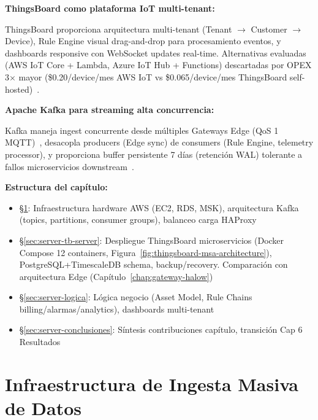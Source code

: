 \textbf{ThingsBoard como plataforma IoT multi-tenant:}

ThingsBoard proporciona arquitectura multi-tenant (Tenant $\rightarrow$ Customer $\rightarrow$ Device), Rule Engine visual drag-and-drop para procesamiento eventos, y dashboards responsive con WebSocket updates real-time. Alternativas evaluadas (AWS IoT Core + Lambda, Azure IoT Hub + Functions) descartadas por OPEX 3$\times$ mayor (\$0.20/device/mes AWS IoT vs \$0.065/device/mes ThingsBoard self-hosted)~\cite{awsGreengrassPricing2024}.

\textbf{Apache Kafka para streaming alta concurrencia:}

Kafka maneja ingest concurrente desde múltiples Gateways Edge (QoS 1 MQTT)~\cite{amiriDeploymentArchitecturesMQTT2024}, desacopla producers (Edge sync) de consumers (Rule Engine, telemetry processor), y proporciona buffer persistente 7 días (retención WAL) tolerante a fallos microservicios downstream~\cite{kraborKafkaPerformanceScalability2023}.

\textbf{Estructura del capítulo:}

\begin{itemize}
    \item \S\ref{sec:server-infraestructura}: Infraestructura hardware AWS (EC2, RDS, MSK), arquitectura Kafka (topics, partitions, consumer groups), balanceo carga HAProxy
    \item \S\ref{sec:server-tb-server}: Despliegue ThingsBoard microservicios (Docker Compose 12 containers, Figura~\ref{fig:thingsboard-msa-architecture}), PostgreSQL+TimescaleDB schema, backup/recovery. Comparación con arquitectura Edge (Capítulo~\ref{chap:gateway-halow})
    \item \S\ref{sec:server-logica}: Lógica negocio (Asset Model, Rule Chains billing/alarmas/analytics), dashboards multi-tenant
    \item \S\ref{sec:server-conclusiones}: Síntesis contribuciones capítulo, transición Cap 6 Resultados
\end{itemize}

\section{Infraestructura de Ingesta Masiva de Datos}
\label{sec:server-infraestructura}


